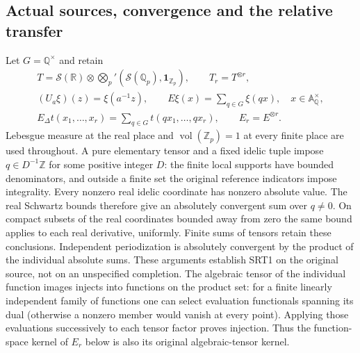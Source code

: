 \subsection{Actual sources, convergence and the relative transfer}
Let $G=\mathbb Q^\times$ and retain
\begin{equation}\tag{SRT1}
\begin{gathered}
T=\mathcal S(\mathbb R)\otimes\bigotimes_p'
 (\mathcal S(\mathbb Q_p),\mathbf1_{\mathbb Z_p}),\qquad T_r=T^{\otimes r},\\
(U_a\xi)(z)=\xi(a^{-1}z),\qquad
E\xi(x)=\sum_{q\in G}\xi(qx),\quad x\in\mathbb A_\mathbb Q^\times,\\
E_\Delta t(x_1,\ldots,x_r)=
 \sum_{q\in G}t(qx_1,\ldots,qx_r),\qquad
E_r=E^{\otimes r}.
\end{gathered}
\end{equation}
Lebesgue measure at the real place and $\operatorname{vol}(\mathbb Z_p)=1$
at every finite place are used throughout. A pure elementary tensor and
a fixed idelic tuple impose $q\in D^{-1}\mathbb Z$ for some positive
integer $D$: the finite local supports have bounded denominators, and
outside a finite set the original reference indicators impose integrality.
Every nonzero real idelic coordinate has nonzero absolute value.
The real Schwartz bounds therefore give an absolutely convergent sum
over $q\ne0$. On compact subsets of the real coordinates bounded away
from zero the same bound applies to each real derivative, uniformly.
Finite sums of tensors retain these conclusions. Independent
periodization is absolutely convergent by the product of the individual
absolute sums. These arguments establish SRT1 on the original source,
not on an unspecified completion.
The algebraic tensor of the individual function images injects into
functions on the product set: for a finite linearly independent family
of functions one can select evaluation functionals spanning its dual
(otherwise a nonzero member would vanish at every point). Applying
those evaluations successively to each tensor factor proves injection.
Thus the function-space kernel of $E_r$ below is also its original
algebraic-tensor kernel.

